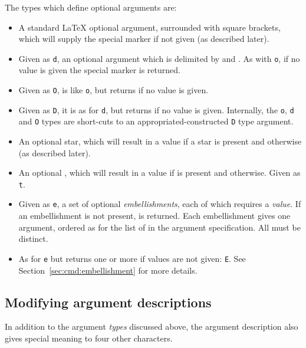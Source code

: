 \documentclass{ltxguide}
\begin{document}
The types which define optional arguments are:
\begin{itemize}
  \item[\texttt{o}] A standard \LaTeX{} optional argument, surrounded with square
    brackets, which will supply the special  marker if not given
    (as described later).
  \item[\texttt{d}] Given as \texttt{d}, an optional
    argument which is delimited by  and . As with
    \texttt{o}, if no value is given the special marker  is
    returned.
  \item[\texttt{O}] Given as \texttt{O}, is like \texttt{o}, but returns
     if no value is given.
  \item[\texttt{D}] Given as \texttt{D}, it is
    as for \texttt{d}, but returns  if no value is given.
    Internally, the \texttt{o}, \texttt{d} and \texttt{O} types are
    short-cuts to an appropriated-constructed \texttt{D} type argument.
  \item[\texttt{s}] An optional star, which will result in a value
     if a star is present and 
    otherwise (as described later).
  \item[\texttt{t}] An optional , which will result in a value
     if  is present and 
    otherwise. Given as \texttt{t}.
  \item[\texttt{e}] Given as \texttt{e}, a set of optional
    \emph{embellishments}, each of which requires a \emph{value}.
    If an embellishment is not present,  is returned.  Each
    embellishment gives one argument, ordered as for the list of
     in the argument specification.  All 
    must be distinct.
  \item[\texttt{E}] As for \texttt{e} but returns one or more 
    if values are not given: \texttt{E}. See
    Section~\ref{sec:cmd:embellishment} for more details.
\end{itemize}

\subsection{Modifying argument descriptions}

In addition to the argument \emph{types} discussed above, the argument
description also gives special meaning to four other characters.
\end{document}
